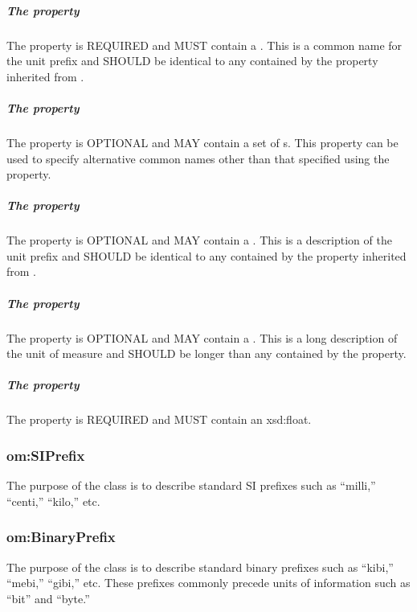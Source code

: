 \subparagraph{The  property}\label{sec:om:label:Prefix}
The  property is REQUIRED and MUST contain a . This  is a common name for the unit prefix and SHOULD be identical to any  contained by the  property inherited from .

\subparagraph{The  property}\label{sec:om:alternativeLabels:Prefix}
The  property is OPTIONAL and MAY contain a set of s. This property can be used to specify alternative common names other than that specified using the  property.

\subparagraph{The  property}\label{sec:om:comment:Prefix}
The  property is OPTIONAL and MAY contain a . This  is a description of the unit prefix and SHOULD be identical to any  contained by the  property inherited from .

\subparagraph{The  property}\label{sec:om:longcomment:Prefix}
The  property is OPTIONAL and MAY contain a . This  is a long description of the unit of measure and SHOULD be longer than any  contained by the  property.

\subparagraph{The  property}\label{sec:om:hasFactor:Prefix}
The  property is REQUIRED and MUST contain an xsd:float.

\subsubsection{om:SIPrefix}
\label{sec:om:SIPrefix}

The purpose of the  class is to describe standard SI prefixes such as ``milli,'' ``centi,'' ``kilo,'' etc.

\subsubsection{om:BinaryPrefix}
\label{sec:om:BinaryPrefix}

The purpose of the  class is to describe standard binary prefixes such as ``kibi,'' ``mebi,'' ``gibi,'' etc. These prefixes commonly precede units of information such as ``bit'' and ``byte.''

